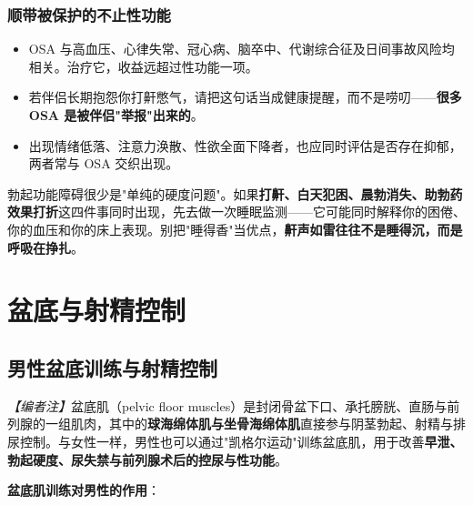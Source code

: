 \documentclass[12pt,a4paper,twoside]{ctexbook}
\begin{document}
\subsection{顺带被保护的不止性功能}

\begin{itemize}
	\item OSA 与高血压、心律失常、冠心病、脑卒中、代谢综合征及日间事故风险均相关。治疗它，收益远超过性功能一项。
	\item 若伴侣长期抱怨你打鼾憋气，请把这句话当成健康提醒，而不是唠叨——\textbf{很多 OSA 是被伴侣"举报"出来的}。
	\item 出现情绪低落、注意力涣散、性欲全面下降者，也应同时评估是否存在抑郁，两者常与 OSA 交织出现。
\end{itemize}

\begin{tcolorbox}[colback=pink!5!white,colframe=red!50!black,title=贴心小叮咛]
勃起功能障碍很少是"单纯的硬度问题"。如果\textbf{打鼾、白天犯困、晨勃消失、助勃药效果打折}这四件事同时出现，先去做一次睡眠监测——它可能同时解释你的困倦、你的血压和你的床上表现。别把"睡得香"当优点，\textbf{鼾声如雷往往不是睡得沉，而是呼吸在挣扎}。
\end{tcolorbox}

\chapter{盆底与射精控制}

\section{男性盆底训练与射精控制}

\noindent\textit{【编者注】}盆底肌（pelvic floor muscles）是封闭骨盆下口、承托膀胱、直肠与前列腺的一组肌肉，其中的\textbf{球海绵体肌与坐骨海绵体肌}直接参与阴茎勃起、射精与排尿控制。与女性一样，男性也可以通过"凯格尔运动"训练盆底肌，用于改善\textbf{早泄、勃起硬度、尿失禁与前列腺术后的控尿与性功能}。

\vspace{0.5em}
\noindent\textbf{盆底肌训练对男性的作用}：
\end{document}
